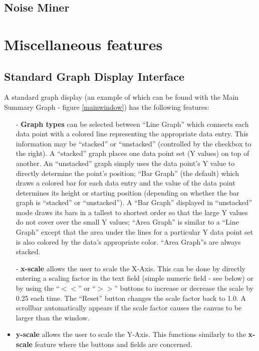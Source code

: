 \documentclass[10pt]{report}
\begin{document}
\subsection{Noise Miner}


\section{Miscellaneous features}
\label{sec::misc}

\subsection{Standard Graph Display Interface} 

A standard graph display (an example of which can be found with the
Main Summary Graph - figure \ref{mainwindow}) has the following
features:

\begin{itemize}
\item[-] {\bf Graph types} can be selected between ``Line Graph'' which
connects each data point with a colored line representing the
appropriate data entry. This information may be ``stacked'' or
``unstacked'' (controlled by the checkbox to the right). A ``stacked''
graph places one data point set (Y values) on top of another. An
``unstacked'' graph simply uses the data point's Y value to directly
determine the point's position; ``Bar Graph'' (the default) which
draws a colored bar for each data entry and the value of the data
point determines its height or starting position (depending on whether
the bar graph is ``stacked'' or ``unstacked''). A ``Bar Graph''
displayed in ``unstacked'' mode draws its bars in a tallest to
shortest order so that the large Y values do not cover over the small
Y values; ``Area Graph'' is similar to a ``Line Graph'' except that the
area under the lines for a particular Y data point set is also colored
by the data's appropriate color. ``Area Graph''s are always stacked.
\item[-] {\bf x-scale} allows the user to scale the X-Axis. This can be
done by directly entering a scaling factor in the text field (simple
numeric field - see below) or by using the ``$<<$'' or ``$>>$'' buttons
to increase or decrease the scale by 0.25 each time. The ``Reset'' button
changes the scale factor back to 1.0. A scrollbar automatically appears
if the scale factor causes the canvas to be larger than the window.
\item {\bf y-scale} allows the user to scale the Y-Axis. This functions 
similarly to the {\bf x-scale} feature where the buttons and fields are
concerned.
\end{itemize}
\end{document}
